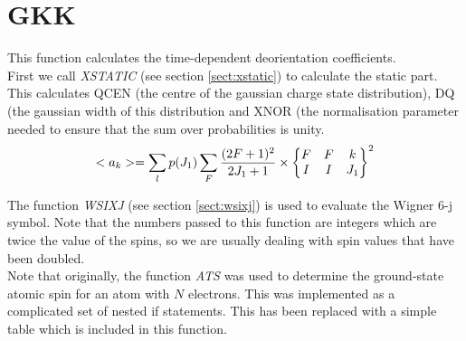 \section{GKK}
\label{sect:gkk}

\noindent This function calculates the time-dependent deorientation
coefficients.\\

\noindent First we call {\em XSTATIC} (see section
\ref{sect:xstatic}) to calculate the static part. This calculates
QCEN (the centre of the gaussian charge state distribution), DQ (the
gaussian width of this distribution and XNOR (the normalisation
parameter needed to ensure that the sum over probabilities is unity.\\

\begin{equation}
<a_k> = \sum_l p(J_1) \sum_F {(2 F + 1)^2 \over 2 J_1 + 1} \times
\begin{Bmatrix}
F & F & k\\
I & I & J_1
\end{Bmatrix}
^2
\end{equation}

\noindent The function {\em WSIXJ} (see section \ref{sect:wsixj}) is
used to evaluate the Wigner 6-j symbol. Note that the numbers passed
to this function are integers which are twice the value of the
spins, so we are usually dealing with spin values that have been
doubled.\\


\noindent Note that originally, the function {\em ATS} was used to determine
the ground-state atomic spin for an atom with $N$ electrons. This was
implemented as a complicated set of nested if statements. This has been
replaced with a simple table which is included in this function.\\

